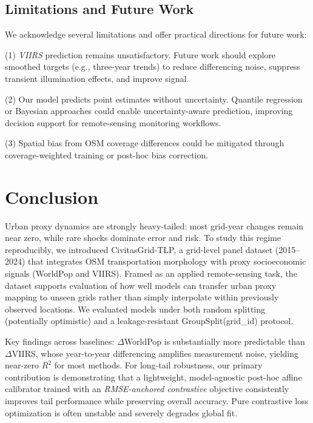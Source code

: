 \documentclass[preprint,12pt]{elsarticle}
\begin{document}
\subsection{Limitations and Future Work}

We acknowledge several limitations and offer practical directions for future work:

(1) \textit{VIIRS} prediction remains unsatisfactory. Future work should explore smoothed targets (e.g., three-year trends) to reduce differencing noise, suppress transient illumination effects, and improve signal.

(2) Our model predicts point estimates without uncertainty. Quantile regression or Bayesian approaches could enable uncertainty-aware prediction, improving decision support for remote-sensing monitoring workflows.

(3) Spatial bias from OSM coverage differences could be mitigated through coverage-weighted training or post-hoc bias correction.

\section{Conclusion}

Urban proxy dynamics are strongly heavy-tailed: most grid-year changes remain near zero, while rare shocks dominate error and risk. To study this regime reproducibly, we introduced CivitasGrid-TLP, a grid-level panel dataset (2015--2024) that integrates OSM transportation morphology with proxy socioeconomic signals (WorldPop and VIIRS). Framed as an applied remote-sensing task, the dataset supports evaluation of how well models can transfer urban proxy mapping to unseen grids rather than simply interpolate within previously observed locations. We evaluated models under both random splitting (potentially optimistic) and a leakage-resistant GroupSplit(grid\_id) protocol.

Key findings across baselines: $\Delta$WorldPop is substantially more predictable than $\Delta$VIIRS, whose year-to-year differencing amplifies measurement noise, yielding near-zero $R^2$ for most methods. For long-tail robustness, our primary contribution is demonstrating that a lightweight, model-agnostic post-hoc affine calibrator trained with an \emph{RMSE-anchored contrastive} objective consistently improves tail performance while preserving overall accuracy. Pure contrastive loss optimization is often unstable and severely degrades global fit.
\end{document}
